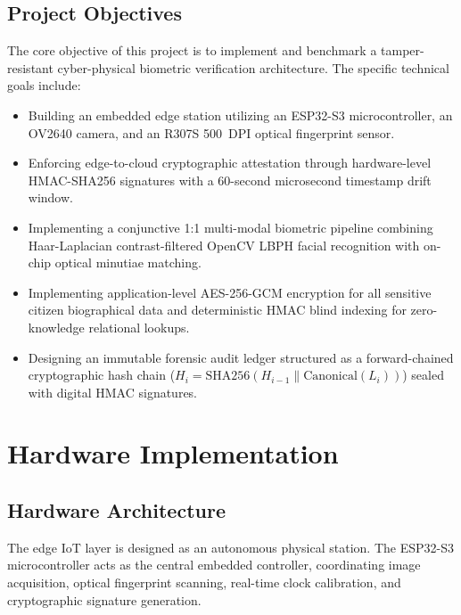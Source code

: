 \documentclass[11pt,a4paper]{article}
\begin{document}
\subsection{Project Objectives}
The core objective of this project is to implement and benchmark a tamper-resistant cyber-physical biometric verification architecture. The specific technical goals include:
\begin{itemize}[leftmargin=2em]
    \item Building an embedded edge station utilizing an ESP32-S3 microcontroller, an OV2640 camera, and an R307S 500~DPI optical fingerprint sensor.
    \item Enforcing edge-to-cloud cryptographic attestation through hardware-level HMAC-SHA256 signatures with a 60-second microsecond timestamp drift window.
    \item Implementing a conjunctive 1:1 multi-modal biometric pipeline combining Haar-Laplacian contrast-filtered OpenCV LBPH facial recognition with on-chip optical minutiae matching.
    \item Implementing application-level AES-256-GCM encryption for all sensitive citizen biographical data and deterministic HMAC blind indexing for zero-knowledge relational lookups.
    \item Designing an immutable forensic audit ledger structured as a forward-chained cryptographic hash chain ($H_i = \text{SHA256}(H_{i-1} \parallel \text{Canonical}(L_i))$) sealed with digital HMAC signatures.
\end{itemize}

\section{Hardware Implementation}

\subsection{Hardware Architecture}
The edge IoT layer is designed as an autonomous physical station. The ESP32-S3 microcontroller acts as the central embedded controller, coordinating image acquisition, optical fingerprint scanning, real-time clock calibration, and cryptographic signature generation.
\end{document}
